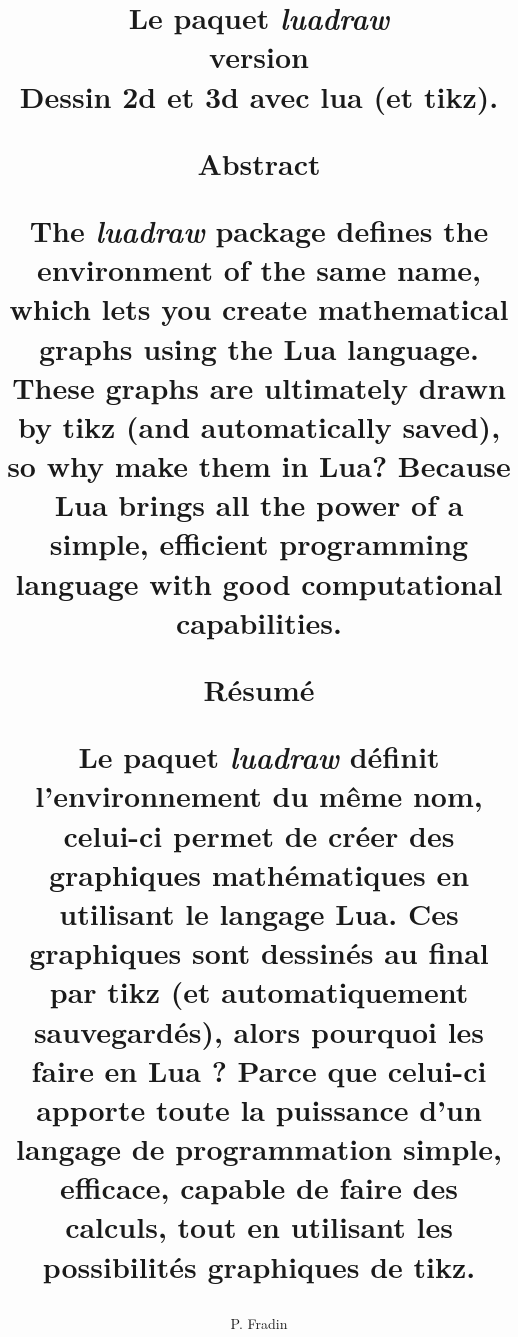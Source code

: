 \documentclass[%
10pt,%
oneside,
a4paper,%
french,%
]%
{book}%
\title{\textbf{Le paquet} \emph{luadraw} \\ version \version\\ Dessin 2d et 3d avec lua (et tikz).\\
\vspace{1cm}
\begin{minipage}{16cm}
\small
\selectlanguage{english}

\hfil\textbf{Abstract}\hfil

The \emph{luadraw} package defines the environment of the same name, which lets you create mathematical graphs using the Lua language. These graphs are ultimately drawn by tikz (and automatically saved), so why make them in Lua? Because Lua brings all the power of a simple, efficient programming language with good computational capabilities.

\vspace{1cm}

\hfil\textbf{Résumé}\hfil

\selectlanguage{french}
Le paquet \emph{luadraw} définit l'environnement du même nom, celui-ci permet de créer des graphiques mathématiques en utilisant le langage Lua. Ces graphiques sont dessinés au final par tikz (et automatiquement sauvegardés), alors pourquoi les faire en Lua ? Parce que celui-ci apporte toute la puissance d'un langage de programmation simple, efficace, capable de faire des calculs, tout en utilisant les possibilités graphiques de tikz.
\end{minipage}
}
\author{P. Fradin}
\begin{document}
\maketitle

\begin{multicols}{2}
\tableofcontents
\end{multicols}


\listoffigures


\renewcommand{\labelitemi}{$\bullet$}
\renewcommand{\labelitemii}{--}
\renewcommand{\labelitemiii}{$*$}
\renewcommand{\thesection}{\Roman{section}~}
\renewcommand{\thesubsection}{\arabic{subsection})}
\renewcommand{\thesubsubsection}{\arabic{subsection}.\arabic{subsubsection}}
\renewcommand{\thefigure}{\arabic{figure}}

%
%
\end{document}
